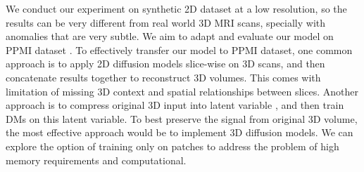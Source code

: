 We conduct our experiment on synthetic 2D dataset at a low resolution, so the results can be very different from real world 3D MRI scans, specially with anomalies that are very subtle. We aim to adapt and evaluate our model on PPMI dataset \cite{mcs+18PPMIParkinsonsProgressionMarkers}. To effectively transfer our model to PPMI dataset, one common approach is to apply 2D diffusion models slice-wise on 3D scans, and then concatenate results together to reconstruct 3D volumes. This comes with limitation of missing 3D context and spatial relationships between slices. Another approach is to compress original 3D input into latent variable \cite{rombachLDM,puglisiBrLP,lozuponeLDAE2025}, and then train \ac{DMs} on this latent variable. To best preserve the signal from original 3D volume, the most effective approach would be to implement 3D diffusion models. We can explore the option of training only on patches to address the problem of high memory requirements and computational. 



